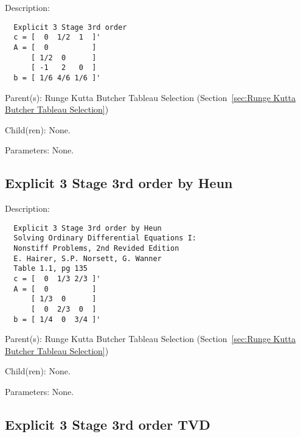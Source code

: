 \begin{list}{}
  {\setlength{\leftmargin}{1.0in}
   \setlength{\labelwidth}{0.75in}
   \setlength{\labelsep}{0.125in}}
  \item[Description:]
\begin{verbatim}
  Explicit 3 Stage 3rd order
  c = [  0  1/2  1  ]'
  A = [  0          ]
      [ 1/2  0      ]
      [ -1   2   0  ]
  b = [ 1/6 4/6 1/6 ]'
\end{verbatim}
  \item[Parent(s):]
    Runge Kutta Butcher Tableau Selection (Section~\ref{sec:Runge Kutta Butcher Tableau Selection})
  \item[Child(ren):]
    None. 
  \item[Parameters:]
    None. 
\end{list}

\subsection{Explicit 3 Stage 3rd order by Heun}
\label{sec:Explicit 3 Stage 3rd order by Heun}

\begin{list}{}
  {\setlength{\leftmargin}{1.0in}
   \setlength{\labelwidth}{0.75in}
   \setlength{\labelsep}{0.125in}}
  \item[Description:]
\begin{verbatim}
  Explicit 3 Stage 3rd order by Heun
  Solving Ordinary Differential Equations I:
  Nonstiff Problems, 2nd Revided Edition
  E. Hairer, S.P. Norsett, G. Wanner
  Table 1.1, pg 135
  c = [  0  1/3 2/3 ]'
  A = [  0          ]
      [ 1/3  0      ]
      [  0  2/3  0  ]
  b = [ 1/4  0  3/4 ]'
\end{verbatim}
  \item[Parent(s):]
    Runge Kutta Butcher Tableau Selection (Section~\ref{sec:Runge Kutta Butcher Tableau Selection})
  \item[Child(ren):]
    None. 
  \item[Parameters:]
    None. 
\end{list}

\subsection{Explicit 3 Stage 3rd order TVD}
\label{sec:Explicit 3 Stage 3rd order TVD}

